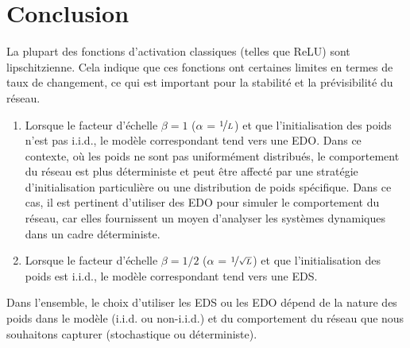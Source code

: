 \section{Conclusion}
La plupart des fonctions d'activation classiques (telles que ReLU) sont lipschitzienne. Cela indique que ces fonctions ont certaines limites en termes de taux de changement, ce qui est important pour la stabilité et la prévisibilité du réseau.

\begin{enumerate}
    \item Lorsque le facteur d'échelle $\beta = 1 $ ($\alpha$ = $\nicefrac{1}{L}$) et que l'initialisation des poids n'est pas i.i.d., le modèle correspondant tend vers une EDO.
    Dans ce contexte, où les poids ne sont pas uniformément distribués, le comportement du réseau est plus déterministe et peut être affecté par une stratégie d'initialisation particulière ou une distribution de poids spécifique. Dans ce cas, il est pertinent d'utiliser des EDO pour simuler le comportement du réseau, car elles fournissent un moyen d'analyser les systèmes dynamiques dans un cadre déterministe.
    \item Lorsque le facteur d'échelle $\beta = 1/2 $ ($\alpha$ = $\nicefrac{1}{\sqrt{L}}$) et que l'initialisation des poids est i.i.d., le modèle correspondant tend vers une EDS.
\end{enumerate}
Dans l'ensemble, le choix d'utiliser les EDS ou les EDO dépend de la nature des poids dans le modèle (i.i.d. ou non-i.i.d.) et du comportement du réseau que nous souhaitons capturer (stochastique ou déterministe).



